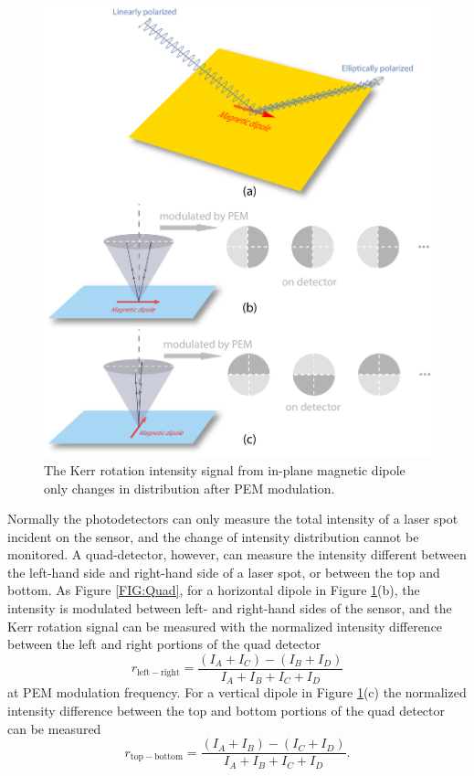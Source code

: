 \documentclass[pdflatex, sectionletters, 12pt]{pittetd}    %
\begin{document}
\begin{figure}[p]
	\centering
	\includegraphics[width=.9\textwidth]{Drawing/KerrInPlane.pdf}
	\caption{The Kerr rotation intensity signal from in-plane magnetic dipole only changes in distribution after PEM modulation.}
	\label{FIG:KerrInPlane}
\end{figure}

Normally the photodetectors can only measure the total intensity of a laser spot incident on the sensor, and the change of intensity distribution cannot be monitored. A quad-detector, however, can measure the intensity different between the left-hand side and right-hand side of a laser spot, or between the top and bottom. As Figure \ref{FIG:Quad}, for a horizontal dipole in Figure \ref{FIG:KerrInPlane}(b), the intensity is modulated between left- and right-hand sides of the sensor, and the Kerr rotation signal can be measured with the normalized intensity difference between the left and right portions of the quad detector
$$
r_\mathrm{left-right} = \frac{(I_A + I_C) - (I_B + I_D)}{I_A + I_B + I_C + I_D}
$$
at PEM modulation frequency. For a vertical dipole in Figure \ref{FIG:KerrInPlane}(c) the normalized intensity difference between the top and bottom portions of the quad detector can be measured
$$
r_\mathrm{top-bottom} = \frac{(I_A + I_B) - (I_C + I_D)}{I_A + I_B + I_C + I_D}.
$$
\\
\end{document}
